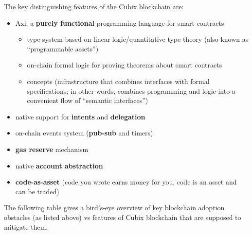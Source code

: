 \documentclass[a4paper]{article}
\begin{document}
The key distinguishing features of the Cubix blockchain are:

\begin{itemize}
  \item Axi, a \textbf{purely functional} programming language for smart contracts
  \begin{itemize}
    \item type system based on linear logic/quantitative type theory (also known as ``programmable assets'')
    \item on-chain formal logic for proving theorems about smart contracts
    \item concepts (infrastructure that combines interfaces with formal specifications; in other words, combines programming and logic into a convenient flow of ``semantic interfaces'')
  \end{itemize}
  \item native support for \textbf{intents} and \textbf{delegation}
  \item on-chain events system (\textbf{pub-sub} and timers)
  \item \textbf{gas reserve} mechanism
  \item native \textbf{account abstraction}
  \item \textbf{code-as-asset} (code you wrote earns money for you, code is an asset and can be traded)
\end{itemize}

The following table gives a bird's-eye overview of key blockchain adoption obstacles (as listed above) vs features of Cubix blockchain that are supposed to mitigate them.
\end{document}
